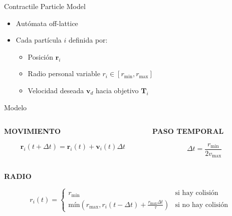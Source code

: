 \documentclass[aspectratio=169]{beamer}
\begin{document}
\begin{frame}{Contractile Particle Model}
    \begin{itemize}
        \item Autómata off-lattice
        \item Cada partícula $i$ definida por:
        \begin{itemize}
            \item Posición $\mathbf{r}_i$
            \item Radio personal variable $r_i \in [r_{\text{min}}, r_{\text{max}}]$
            \item Velocidad deseada $\mathbf{v}_d$ hacia objetivo $\mathbf{T}_i$
        \end{itemize}
    \end{itemize}
\end{frame}

\begin{frame}{Modelo}
    \begin{columns}
        \begin{column}{0.5\textwidth}
            {\centering\textbf{MOVIMIENTO}\par}
            \vspace{0.5em}
            \[
                \mathbf{r}_i(t + \Delta t) = \mathbf{r}_i(t) + \mathbf{v}_i(t)\Delta t
            \]
        \end{column}
        \begin{column}{0.5\textwidth}
            {\centering\textbf{PASO TEMPORAL}\par}
            \vspace{0.5em}
            \[
                \Delta t = \frac{r_{\text{min}}}{2v_{\text{max}}}
            \]
        \end{column}
    \end{columns}
    
    \vspace{1em}
    {\centering\textbf{RADIO}\par}
    \vspace{0.5em}
    \[
        r_i(t) = \begin{cases}
            r_{\text{min}} & \text{si hay colisión} \\
            \text{mín}(r_{\text{max}}, r_i(t - \Delta t) + \frac{r_{\text{max}}\Delta t}{\tau}) & \text{si no hay colisión}
        \end{cases}
    \]
\end{frame}
\end{document}
